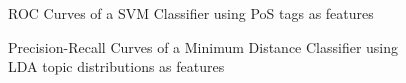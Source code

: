 \begin{figure}[H]
	\centering
	\caption[ROC Curves of a SVM  Classifier using PoS tags as features]{ROC Curves of a SVM  Classifier using PoS tags as features}
	\label{fig:baseline-roc-svm-pos}
\end{figure}

\begin{figure}[H]
	\centering
	\caption[Precision-Recall Curves of a Minimum Distance Classifier using LDA topic distributions as features]{Precision-Recall Curves of a Minimum Distance Classifier using LDA topic distributions as features}
	\label{fig:baseline-pr-mdc-lda}
\end{figure}

